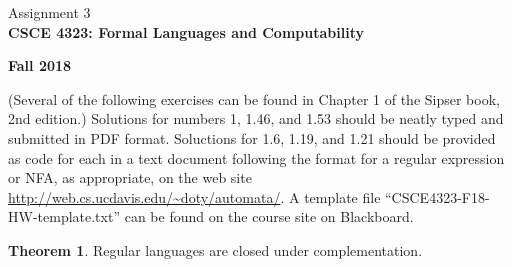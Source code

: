 \documentclass[]{book}
\theoremstyle{definition}
\newtheorem{thm}{Theorem}
\begin{document}

\begin{center}
{\Large Assignment 3}\\
\textbf{CSCE 4323: Formal Languages and Computability}

\textbf{Fall 2018}
\end{center}

\vspace{0.2 cm}


(Several of the following exercises can be found in Chapter 1 of the Sipser book, 2nd edition.)
Solutions for numbers 1, 1.46, and 1.53 should be neatly typed and submitted in PDF format. Soluctions for 1.6, 1.19, and 1.21 should be provided as code for each in a text document following the format for a regular expression or NFA, as appropriate, on the web site \url{http://web.cs.ucdavis.edu/~doty/automata/}. A template file ``CSCE4323-F18-HW-template.txt'' can be found on the course site on Blackboard.

\begin{thm}Regular languages are closed under complementation.\label{thm:comp}
\end{thm}
\end{document}
